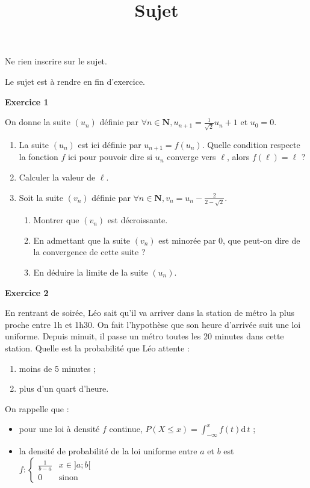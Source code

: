 \documentclass[12pt,a4paper,french]{article}
\author{}
\title{Sujet \no{6}}
\date{}
\begin{document}
\maketitle
\begin{center}Ne rien inscrire sur le sujet.

  Le sujet est à rendre en fin d'exercice.
\end{center}

\bigskip

\textbf{Exercice 1}

On donne la suite $(u_n)$ définie par $\forall n\in \mathbf{N},
u_{n+1} = \frac{1}{\sqrt{2}}u_{n} + 1$ et $u_0 = 0$.
\begin{enumerate}
  \item La suite $(u_n)$ est ici définie par $u_{n+1} = f(u_n)$. Quelle
    condition respecte la fonction $f$ ici pour pouvoir dire si $u_n$
    converge vers $\ell$, alors $f(\ell) = \ell$ ?
  \item Calculer la valeur de $\ell$.
  \item Soit la suite $(v_n)$ définie par $\forall n\in \mathbf{N}, v_n
    = u_n - \frac{2}{2 - \sqrt{2}}$.
    \begin{enumerate}
      \item Montrer que $(v_n)$ est décroissante.
      \item En admettant que la suite $(v_n)$ est minorée par 0, que
        peut-on dire de la convergence de cette suite ?
      \item En déduire la limite de la suite $(u_n)$.
    \end{enumerate}
\end{enumerate}

\medskip

\textbf{Exercice 2}

En rentrant de soirée, Léo sait qu'il va arriver dans la station de
métro la plus proche entre 1h et 1h30. On fait l'hypothèse que son heure
d'arrivée suit une loi uniforme. Depuis minuit, il passe un métro toutes
les 20 minutes dans cette station. Quelle est la probabilité que Léo
attente :
\begin{enumerate}
  \item moins de 5 minutes ;
  \item plus d'un quart d'heure.
\end{enumerate}

On rappelle que :
\begin{itemize}
  \item pour une loi à densité $f$ continue, $P(X \leq x) =
    \int_{-\infty}^x f(t) \mathrm{d}\,t$ ;
  \item la densité de probabilité de la loi uniforme entre $a$ et $b$
    est $f : \left\lbrace \begin{array}{lr} \frac1{b-a} & x \in ]a;b[
    \\ 0 & \text{sinon}\end{array}\right.$
\end{itemize}
\end{document}
